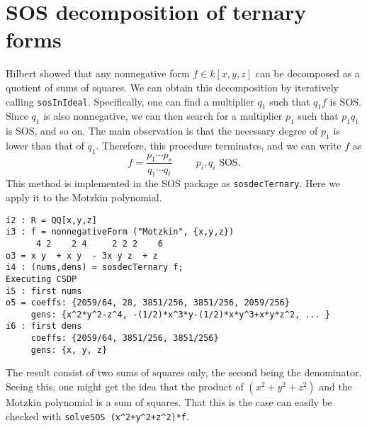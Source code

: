 \documentclass[11pt]{amsart}
\theoremstyle{plain}%
\theoremstyle{definition}
\theoremstyle{remark}
\newcommand{\SOS}{\textsc{SOS}\xspace}
\begin{document}
\section{SOS decomposition of ternary forms}

Hilbert showed that any nonnegative form $f\in k[x,y,z]$ can be decomposed as a quotient of sums of squares.
We can obtain this decomposition by iteratively calling \verb|sosInIdeal|.
Specifically, one can find a multiplier $q_{1}$ such that $q_{1}f$ is SOS.
Since $q_1$ is also nonnegative, we can then search for a multiplier $p_{1}$ such that $p_{1}q_{1}$ is SOS, and so on.
The main observation is that the necessary degree of $p_{1}$ is lower than that of $q_{1}$.
Therefore, this procedure terminates, and we can write $f$ as
\[
  f = \frac{p_{1}\cdots p_{s}}{q_{1}\cdots q_{t}} \qquad \text {
    $p_{i},q_{i}$ SOS}.
\]
This method is implemented in the \SOS package as \verb|sosdecTernary|.  
Here we apply it to the Motzkin polynomial.
{\small
\begin{verbatim}
i2 : R = QQ[x,y,z]
i3 : f = nonnegativeForm ("Motzkin", {x,y,z})
      4 2    2 4     2 2 2    6
o3 = x y  + x y  - 3x y z  + z
i4 : (nums,dens) = sosdecTernary f;
Executing CSDP
i5 : first nums
o5 = coeffs: {2059/64, 28, 3851/256, 3851/256, 2059/256}
     gens: {x^2*y^2-z^4, -(1/2)*x^3*y-(1/2)*x*y^3+x*y*z^2, ... }
i6 : first dens
     coeffs: {2059/64, 3851/256, 3851/256}
     gens: {x, y, z}
\end{verbatim}
}
The result consist of two sums of squares only, the second being the denominator.
Seeing this, one might get the idea that the product of $(x^{2}+y^{2}+z^{2})$ and the Motzkin polynomial is a sum of squares.
That this is the case can easily be checked with \verb|solveSOS (x^2+y^2+z^2)*f|.


\end{document}
